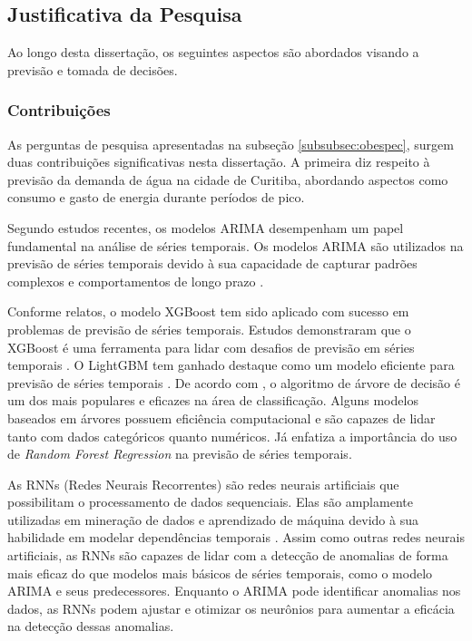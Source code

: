 \subsection{Justificativa da Pesquisa} \label{subsec:justif}

Ao longo desta dissertação, os seguintes aspectos são abordados visando a previsão e tomada de decisões.

\subsubsection{Contribui\c c\~oes} \label{subsubsec:Contribuição}

As perguntas de pesquisa apresentadas na subseção \ref{subsubsec:obespec}, surgem duas contribuições significativas nesta dissertação. A primeira diz respeito à previsão da demanda de água na cidade de Curitiba, abordando aspectos como consumo e gasto de energia durante períodos de pico.

Segundo estudos recentes, os modelos ARIMA desempenham um papel fundamental na análise de séries temporais. Os modelos ARIMA são utilizados na previsão de séries temporais devido à sua capacidade de capturar padrões complexos e comportamentos de longo prazo \cite{arima_python}.

Conforme relatos, o modelo XGBoost tem sido aplicado com sucesso em problemas de previsão de séries temporais. Estudos demonstraram que o XGBoost é uma ferramenta para lidar com desafios de previsão em séries temporais \cite{xgboost_intro}. O LightGBM tem ganhado destaque como um modelo eficiente para previsão de séries temporais \cite{WELLENS20221482}. De acordo com , o algoritmo de árvore de decisão é um dos mais populares e eficazes na área de classificação. Alguns modelos baseados em árvores possuem eficiência computacional e são capazes de lidar tanto com dados categóricos quanto numéricos. Já  enfatiza a importância do uso de \textit{Random Forest Regression} na previsão de séries temporais.

As RNNs (Redes Neurais Recorrentes) são redes neurais artificiais que possibilitam o processamento de dados sequenciais. Elas são amplamente utilizadas em mineração de dados e aprendizado de máquina devido à sua habilidade em modelar dependências temporais \cite{rnn}. Assim como outras redes neurais artificiais, as RNNs são capazes de lidar com a detecção de anomalias de forma mais eficaz do que modelos mais básicos de séries temporais, como o modelo ARIMA e seus predecessores. Enquanto o ARIMA pode identificar anomalias nos dados, as RNNs podem ajustar e otimizar os neurônios para aumentar a eficácia na detecção dessas anomalias.

